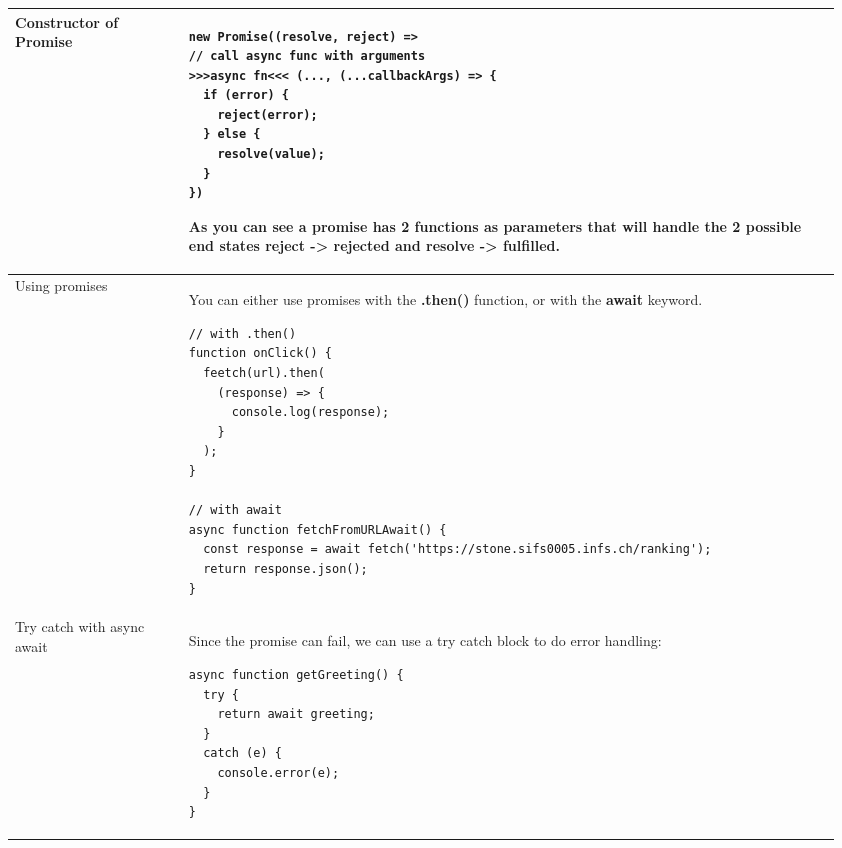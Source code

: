 \documentclass[main.tex,fontsize=8pt,paper=a4,paper=portrait,DIV=calc,]{scrartcl}
\begin{document}
\begin{table}[ht!]
\begin{tabular}{|m{0.2\linewidth}|m{0.755\linewidth}|}
\hline
Constructor of Promise & 
\begin{lstlisting}
new Promise((resolve, reject) =>
// call async func with arguments
>>>async fn<<< (..., (...callbackArgs) => {
  if (error) {
    reject(error);
  } else {
    resolve(value);
  }
})
\end{lstlisting}
As you can see a promise has 2 functions as parameters that will handle the 2 possible end states reject -> rejected and resolve -> fulfilled.\\
\hline
Using promises & 
You can either use promises with the \textbf{.then()} function, or with the \textbf{await} keyword.\newline
\begin{lstlisting}
// with .then()
function onClick() {
  feetch(url).then(
    (response) => {
      console.log(response);
    }
  );
}

// with await
async function fetchFromURLAwait() {
  const response = await fetch('https://stone.sifs0005.infs.ch/ranking');
  return response.json();
}
\end{lstlisting}\\
\hline
Try catch with async await & 
Since the promise can fail, we can use a try catch block to do error handling:\newline 
\begin{lstlisting}
async function getGreeting() {
  try {
    return await greeting;
  }
  catch (e) {
    console.error(e);
  }
}
\end{lstlisting}\\
\hline
\end{tabular}
\end{table}
\pagebreak
\end{document}
